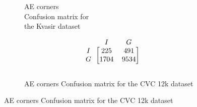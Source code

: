 \begin{figure}[h]
\begin{subfigure}[b]{0.49\textwidth}
        
\caption{AE corners \\Confusion matrix for \\the Kvasir dataset}
\label{mat:kvasir_CM_IRV2_AE_CORNER}
\end{subfigure}
\begin{subfigure}[b]{0.25\textwidth}
        \[
\begin{blockarray}{ccc}
& I & G  \\
\begin{block}{c[cc]}
 		I&225 & 491\\
        G&1704  & 9534\\
\end{block}
\end{blockarray}
\]   
\caption{AE corners Confusion matrix for the CVC 12k dataset}
\label{mat:cvc12k_CM_IRV2_AE_CORNER}
\end{subfigure}

\vspace{1cm}


\end{figure}
